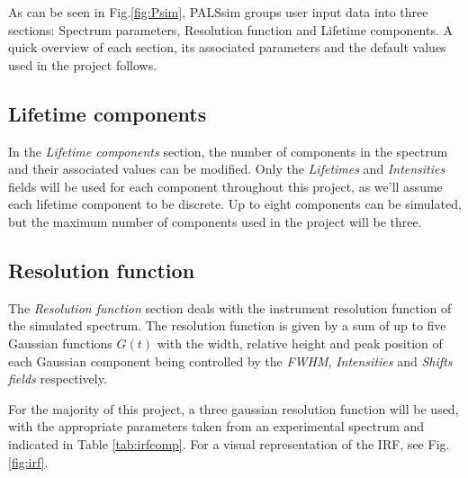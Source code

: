 As can be seen in Fig.\ref{fig:Psim}, PALSsim groups user input data into three sections: Spectrum parameters, Resolution function and Lifetime components. A quick overview of each section, its associated parameters and the default values used in the project follows.

\subsection{Lifetime components}
In the \textit{Lifetime components} section, the number of components in the spectrum and their associated values can be modified. Only the \textit{Lifetimes} and \textit{Intensities} fields will be used for each component throughout this project, as we'll assume each lifetime component to be discrete. Up to eight components can be simulated, but the maximum number of components used in the project will be three.

\subsection{Resolution function}

The \textit{Resolution function} section deals with the instrument resolution function of the simulated spectrum. The resolution function is given by a sum of up to five Gaussian functions $G(t)$ with the width, relative height and peak position of each Gaussian component being controlled by the \textit{FWHM}, \textit{Intensities} and \textit{Shifts fields} respectively.

For the majority of this project, a three gaussian resolution function will be used, with the appropriate parameters taken from an experimental spectrum and indicated in Table \ref{tab:irfcomp}. For a visual representation of the IRF, see Fig. \ref{fig:irf}.

\vspace{0.7cm}


